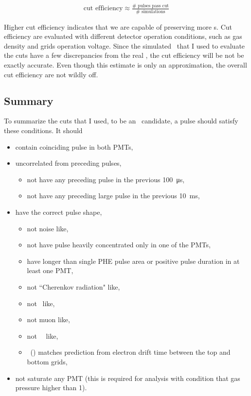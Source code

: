 \begin{align}
 \text{cut efficiency} \approx \frac{\text{\#\  pulses pass cut}}{\text{\#\  simulations}}
\end{align} 

Higher cut efficiency indicates that we are capable of preserving more \ees s. Cut efficiency are evaluated with different detector operation conditions, such as gas density and grids operation voltage. Since the simulated \ees\ that I used to evaluate the cuts have a few discrepancies from the real \ees, the cut efficiency will be not be exactly accurate. Even though this estimate is only an approximation, the overall cut efficiency are not wildly off.

\subsection{Summary}
To summarize the cuts that I used, to be an \ees\ candidate, a pulse should satisfy these conditions. It should
\begin{itemize}
\item contain coinciding pulse in both PMTs,
\item uncorrelated from preceding pulses,
 \begin{itemize}
 \item not have any preceding pulse in the previous \SI{100}{\us},
 \item not have any preceding large pulse in the previous \SI{10}{\ms},
 \end{itemize}
\item have the correct pulse shape, 
 \begin{itemize}
 	 \item not noise like,
 	 \item not have pulse heavily concentrated only in one of the PMTs,
 \item have longer than single PHE pulse area or positive pulse duration in at least one PMT,
 \item not ``Cherenkov radiation" like, 
 \item not \sone\ like,
 \item not muon like,
 \item not \sone\ \stwo\ like,

 \item \ttenninety\ (\rpd ) matches prediction from electron drift time between the top and bottom grids, 
 \end{itemize}
\item not saturate any PMT (this is required for analysis with condition that gas pressure higher than \SI{1}{\bara}).
\end{itemize}


